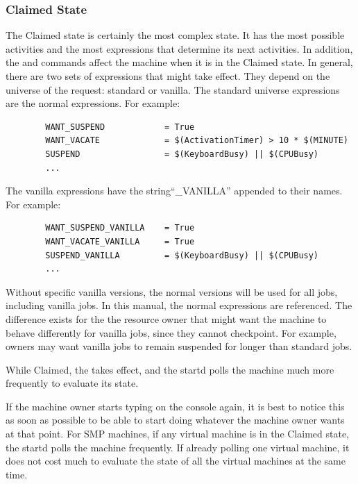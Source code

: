 \subsubsection{\label{sec:Claimed-State}Claimed State}

The Claimed state is certainly the most complex state.
It has the most possible activities and the most expressions that
determine its next activities.
In addition, the  and  commands affect
the machine when it is in the Claimed state.
In general, there are two sets of expressions that might take effect.
They depend on the universe of the request: standard or vanilla.
The standard universe expressions are the normal expressions.
For example:
\begin{verbatim}
        WANT_SUSPEND            = True
        WANT_VACATE             = $(ActivationTimer) > 10 * $(MINUTE)
        SUSPEND                 = $(KeyboardBusy) || $(CPUBusy)
        ...
\end{verbatim}

The vanilla expressions have the string``\_VANILLA'' appended to their names.
For example:
\begin{verbatim}
        WANT_SUSPEND_VANILLA    = True
        WANT_VACATE_VANILLA     = True
        SUSPEND_VANILLA         = $(KeyboardBusy) || $(CPUBusy)
        ...
\end{verbatim}

Without specific vanilla versions, the normal versions
will be used for all jobs, including vanilla jobs.  
In this manual, the normal expressions are referenced.
The difference exists for the
the resource owner that might want the machine
to behave differently for vanilla jobs, since they cannot checkpoint.
For example, owners may want vanilla jobs to remain suspended for
longer than standard jobs.

While Claimed, the  takes effect, and the
startd polls the machine much more frequently to evaluate its
state.

If the machine owner starts typing on the console again,
it is best to notice this as
soon as possible to be able to start doing whatever 
the machine owner wants at that point.
For SMP machines, if any virtual machine is in the Claimed state, the
startd polls the machine frequently.
If already polling one virtual machine, it does not
cost much to evaluate the state of all the virtual machines at
the same time.

